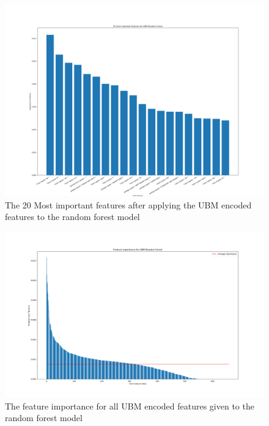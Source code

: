\begin{landscape}
    \begin{figure}
        \centering
        \includegraphics[scale=.34]{./pictures/FeatureImpotrance20.png}
        \caption{The 20 Most important features after applying the UBM encoded
        features to the random forest model}
        \label{fig:feature_importance_small}
    \end{figure}
\end{landscape}

\begin{figure}
    \centering
    \includegraphics[scale=.34]{./pictures/FeatureImpotranceAll.png}
    \caption{The feature importance for all UBM encoded features given
    to the random forest model}
    \label{fig:feature_importance_all}
\end{figure}

